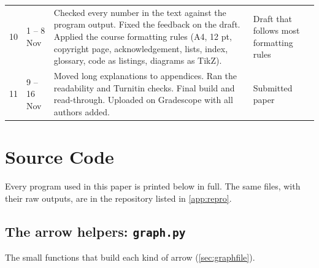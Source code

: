 \begin{longtable}{@{}>{\raggedright}p{0.9cm}>{\raggedright}p{2.5cm}>{\raggedright}p{7.2cm}>{\raggedright\arraybackslash}p{4.2cm}@{}}
10 & 1 -- 8 Nov & Checked every number in the text against the program output. Fixed the feedback on the draft. Applied the course formatting rules (A4, 12 pt, copyright page, acknowledgement, lists, index, glossary, code as listings, diagrams as TikZ). & Draft that follows most formatting rules \\
11 & 9 -- 16 Nov & Moved long explanations to appendices. Ran the readability and Turnitin checks. Final build and read-through. Uploaded on Gradescope with all authors added. & Submitted paper \\
\end{longtable}

\chapter{Source Code}
\label{app:code}

Every program used in this paper is printed below in full. The same files, with their raw outputs, are in the repository listed in \cref{app:repro}.

\section{The arrow helpers: \texttt{graph.py}}
The small functions that build each kind of arrow (\cref{sec:graphfile}).

